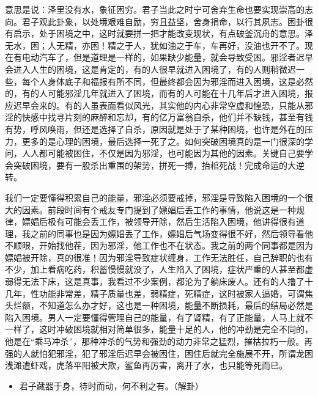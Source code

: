 意思是说：泽里没有水，象征困穷。君子当此之时宁可舍弃生命也要实现崇高的志向。君子观此卦象，以处境艰难自励，穷且益坚，舍身捐命，以行其夙志。困卦很有启示，处于困境之中，这时就要拼一把才能改变现状，有点破釜沉舟的意思。泽无水，困；人无精，亦困！精之于人，犹如油之于车，车再好，没油也开不了。现在有电动汽车了，但是道理是一样的，如果缺少能量，就会导致受困。邪淫者迟早会进入人生的困境，这是肯定的，有的人很早就进入困境了，有的人则稍微迟一些，每个人身体底子和福报有所不同，但最终都会因为邪淫而进入困境，这是必然的，有的人可能邪淫几年就进入了困境，而有的人可能在十几年后才进入困境，报应迟早会来的。有的人虽表面看似风光，其实他的内心非常空虚和惶恐，只能从邪淫的快感中找寻片刻的麻醉和忘却，有的亿万富翁自杀，他们并不缺钱，甚至有钱有势，呼风唤雨，但还是选择了自杀，原因就是处于了某种困境，也许是外在的压力，更多的是心理的困境，最后选择一死了之。如何突破困境真的是一门很深的学问，人人都可能被困住，不仅是因为邪淫，也可能因为其他的因素。关键自己要学会突破困境，要有一股杀出重围的架势，拼死一搏，抬棺死战！完成命运的大逆转。

我们一定要懂得积累自己的能量，邪淫必须要戒掉，邪淫是导致陷入困境的一个很大的因素。前段时间有个戒友专门提到了嫖娼后丢工作的事情，他说这是一种规律，嫖娼后极有可能会丢工作，被领导开除，然后生活陷入困境，他讲得很有道理，我之前的同事也是因为嫖娼丢了工作，嫖娼后气场变得很不好，然后领导看他不顺眼，开始找他茬，因为邪淫，他工作也不在状态。我之前的两个同事都是因为嫖娼被开除，真的很准！因为邪淫导致症状缠身，工作无法胜任，自己辞职的也有不少，加上看病吃药，积蓄慢慢就没了，人生陷入了困境，症状严重的人甚至都虚弱得无法下床，这是真事，我看过不少案例，都沦为了躺床废人。还有的人撸了十几年，性功能非常差，精子质量也差，弱精症，死精症，这时被家人逼婚，可谓焦头烂额，不知道怎么办才好，这也是一种困境，能量不断损耗，最后的结局必然是陷入困境。男人一定要懂得管理自己的能量，有了肾精，有了正能量，人马上就不一样了，这时冲破困境就相对简单很多，能量十足的人，他的冲劲是完全不同的，他是在“乘马冲杀”，那种冲杀的气势和强劲的动力非常之猛烈，摧枯拉朽一般。再强的人就怕犯邪淫，犯了邪淫后迟早会被困住，困住后就完全施展不开，所谓龙困浅滩遭虾戏，虎落平阳被犬欺，鲨鱼再厉害，离开了水，也只能等死而已。

\begin{itemize}\it
    \item 君子藏器于身，待时而动，何不利之有。（解卦）
\end{itemize}


